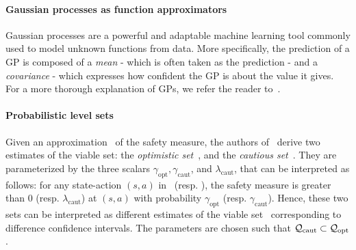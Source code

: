 	\paragraph{Gaussian processes as function approximators} Gaussian processes are a powerful and adaptable machine learning tool commonly used to model unknown functions from data. More specifically, the prediction of a GP is composed of a\emph{ mean} - which is often taken as the prediction - and a\emph{ covariance} - which expresses how confident the GP is about the value it gives. For a more thorough explanation of GPs, we refer the reader to~\cite{williams2006gaussian}. 
	
	\paragraph{Probabilistic level sets} Given an approximation \LQhat~of the safety measure, the authors of~\cite{heim2020learnable} derive two estimates of the viable set: the\emph{ optimistic set}~\Qopt, and the\emph{ cautious set}~\Qcaut. They are parameterized by the three scalars $\gamma_\text{opt}, \gamma_\text{caut}$, and $\lambda_\text{caut}$, that can be interpreted as follows: for any state-action $(s,a)$ in \Qopt~(resp. \Qcaut), the safety measure is greater than $0$ (resp. $\lambda_\text{caut}$) at $(s, a)$ with probability $\gamma_\text{opt}$ (resp. $\gamma_\text{caut}$).  Hence, these two sets can be interpreted as different estimates of the viable set \QV~corresponding to difference confidence intervals. The parameters are chosen such that $\mathcal{Q}_\text{caut} \subset \mathcal{Q}_\text{opt}$.
	
